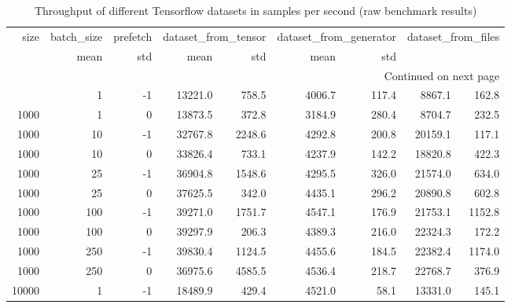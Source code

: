 \begin{longtable}{rrrrrrrrr}
\caption{Throughput of different Tensorflow datasets in samples per second (raw benchmark results)}\label{tab:tfDatasetThroughputBenchmarkRaw}\\
\toprule
    size & batch\_size & prefetch & \multicolumn{2}{l}{dataset\_from\_tensor} & \multicolumn{2}{l}{dataset\_from\_generator} & \multicolumn{2}{l}{dataset\_from\_files} \\
         &                mean &       std &                   mean &    std &               mean &      std \\
\midrule
\endhead
\midrule
\multicolumn{9}{r}{{Continued on next page}} \\
\midrule
\endfoot

\bottomrule
\endlastfoot
    1000 &          1 &       -1 &             13221.0 &     758.5 &                 4006.7 &  117.4 &             8867.1 &    162.8 \\
    1000 &          1 &        0 &             13873.5 &     372.8 &                 3184.9 &  280.4 &             8704.7 &    232.5 \\
    1000 &         10 &       -1 &             32767.8 &    2248.6 &                 4292.8 &  200.8 &            20159.1 &    117.1 \\
    1000 &         10 &        0 &             33826.4 &     733.1 &                 4237.9 &  142.2 &            18820.8 &    422.3 \\
    1000 &         25 &       -1 &             36904.8 &    1548.6 &                 4295.5 &  326.0 &            21574.0 &    634.0 \\
    1000 &         25 &        0 &             37625.5 &     342.0 &                 4435.1 &  296.2 &            20890.8 &    602.8 \\
    1000 &        100 &       -1 &             39271.0 &    1751.7 &                 4547.1 &  176.9 &            21753.1 &   1152.8 \\
    1000 &        100 &        0 &             39297.9 &     206.3 &                 4389.3 &  216.0 &            22324.3 &    172.2 \\
    1000 &        250 &       -1 &             39830.4 &    1124.5 &                 4455.6 &  184.5 &            22382.4 &   1174.0 \\
    1000 &        250 &        0 &             36975.6 &    4585.5 &                 4536.4 &  218.7 &            22768.7 &    376.9 \\
   10000 &          1 &       -1 &             18489.9 &     429.4 &                 4521.0 &   58.1 &            13331.0 &    145.1 \\

\end{longtable}
